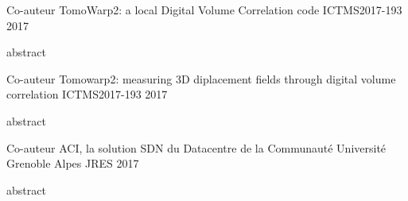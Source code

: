 

\begin{cventries}

  \cventry
    {Co-auteur} %
    {TomoWarp2: a local Digital Volume Correlation code} %
    {ICTMS2017-193} %
    {2017} %
    {
      \begin{cvitems} %
        \item {abstract}
      \end{cvitems}
    }

  \cventry
    {Co-auteur} %
    {Tomowarp2: measuring 3D diplacement fields through digital volume correlation} %
    {ICTMS2017-193} %
    {2017} %
    {
      \begin{cvitems} %
        \item {abstract}
      \end{cvitems}
    }

  \cventry
    {Co-auteur} %
    {ACI, la solution SDN du Datacentre de la Communauté Université Grenoble Alpes} %
    {JRES} %
    {2017} %
    {
      \begin{cvitems} %
        \item {abstract}
      \end{cvitems}
    }

\end{cventries}
